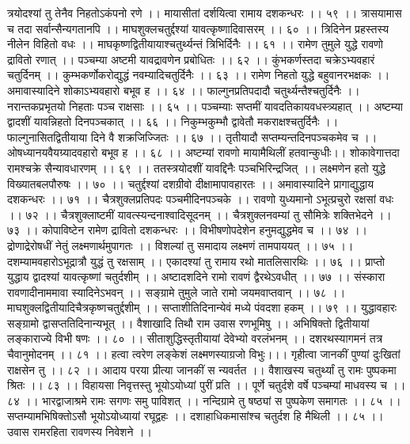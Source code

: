 त्रयोदश्यां तु तेनैव निहतोऽकंपनो रणे ।।
मायासीतां दर्शयित्वा रामाय दशकन्धरः ।। ५९ ।।
त्रासयामास च तदा सर्वान्सैन्यगतानपि ।।
माघशुक्लचतुर्द्दश्यां यावत्कृष्णादिवासरम् ।। ६० ।।
त्रिदिनेन प्रहस्तस्य नीलेन विहितो वधः ।।
माघकृष्णद्वितीयायाश्चतुर्थ्यन्तं त्रिभिर्दिनैः ।। ६१ ।।
रामेण तुमुले युद्धे रावणो द्रावितो रणात् ।।
पञ्चम्या अष्टमी यावद्रावणेन प्रबोधितः ।। ६२ ।।
कुंभकर्णस्तदा चक्रेऽभ्यवहारं चतुर्दिनम् ।।
कुम्भकर्णोकरोद्युद्धं नवम्यादिचतुर्दिनैः ।। ६३ ।।
रामेण निहतो युद्धे बहुवानरभक्षकः ।।
अमावास्यादिने शोकाऽभ्यवहारो बभूव ह ।। ६४ ।।
फाल्गुनप्रतिपदादौ चतुर्थ्यन्तैश्चतुर्दिनैः ।।
नरान्तकप्रभृतयो निहताः पञ्च राक्षसाः ।। ६५ ।।
पञ्चम्याः सप्तमीं यावदतिकायवधस्त्र्यहात् ।।
अष्टम्या द्वादशीं यावन्निहतो दिनपञ्चकात् ।। ६६ ।।
निकुम्भकुम्भौ द्वावेतौ मकराक्षश्चतुर्दिनैः ।।
फाल्गुनासितद्वितीयाया दिने वै शक्रजिज्जितः ।। ६७ ।।
तृतीयादौ सप्तम्यन्तदिनपञ्चकमेव च ।।
ओषध्यानयवैयग्र्यादवहारो बभूव ह ।। ६८ ।।
अष्टम्यां रावणो मायामैथिलीं हतवान्कुधीः।।
शोकावेगात्तदा रामश्चक्रे सैन्यावधारणम् ।। ६९ ।।
ततस्त्रयोदशीं यावद्दिनैः पञ्चभिरिन्द्रजित् ।।
लक्ष्मणेन हतो युद्धे विख्यातबलपौरुषः ।। ७० ।।
चतुर्द्दश्यां दशग्रीवो दीक्षामापावहारतः ।।
अमावास्यादिने प्रागाद्युद्धाय दशकन्धरः ।। ७१ ।।
चैत्रशुक्लप्रतिपदः पञ्चमीदिनपञ्चके ।।
रावणो युध्यमानो ऽभूत्प्रचुरो रक्षसां वधः ।। ७२ ।।
चैत्रशुक्लाष्टमीं यावत्स्यन्दनाश्वादिसूदनम् ।।
चैत्रशुक्लनवम्यां तु सौमित्रेः शक्तिभेदने ।। ७३ ।।
कोपाविष्टेन रामेण द्रावितो दशकन्धरः ।।
विभीषणोपदेशेन हनुमद्युद्धमेव च ।। ७४ ।।
द्रोणाद्रेरोषधीं नेतुं लक्ष्मणार्थमुपागतः ।।
विशल्यां तु समादाय लक्ष्मणं तामपाययत् ।। ७५ ।।
दशम्यामवहारोऽभूद्रात्रौ युद्धं तु रक्षसाम् ।।
एकादश्यां तु रामाय रथो मातलिसारथिः ।। ७६ ।।
प्राप्तो युद्धाय द्वादश्यां यावत्कृष्णां चतुर्दशीम् ।।
अष्टादशदिने रामो रावणं द्वैरथेऽवधीत् ।। ७७ ।।
संस्कारा रावणादीनाममावा स्यादिनेऽभवन् ।।
सङ्ग्रामे तुमुले जाते रामो जयमवाप्तवान् ।। ७८ ।।
माघशुक्लद्वितीयादिचैत्रकृष्णचतुर्द्दशीम् ।।
सप्ताशीतिदिनान्येवं मध्ये पंवदशा हकम् ।। ७९ ।।
युद्धावहारः सङ्ग्रामो द्वासप्ततिदिनान्यभूत् ।।
वैशाखादि तिथौ राम उवास रणभूमिषु ।।
अभिषिक्तो द्वितीयायां लङ्काराज्ये विभी षणः ।। ८० ।।
सीताशुद्धिस्तृतीयायां देवेभ्यो वरलंभनम् ।।
दशरथस्यागमनं तत्र चैवानुमोदनम् ।। ८१ ।।
हत्वा त्वरेण लङ्केशं लक्ष्मणस्याग्रजो विभुः।।।
गृहीत्वा जानकीं पुण्यां दुःखितां राक्षसेन तु ।। ८२ ।।
आदाय परया प्रीत्या जानकीं स न्यवर्तत ।।
वैशाखस्य चतुर्थ्यां तु रामः पुष्पकमा श्रितः ।। ८३ ।।
विहायसा निवृत्तस्तु भूयोऽयोध्यां पुरीं प्रति ।।
पूर्णे चतुर्दशे वर्षे पञ्चम्यां माधवस्य च ।। ८४ ।।
भारद्वाजाश्रमे रामः सगणः समु पाविशत् ।।
नन्दिग्रामे तु षष्ठ्यां स पुष्पकेण समागतः ।। ८५ ।।
सप्तम्यामभिषिक्तोऽसौ भूयोऽयोध्यायां रघूद्वहः ।।
दशाहाधिकमासांश्च चतुर्दश हि मैथिली ।। ८५ ।।
उवास रामरहिता रावणस्य निवेशने ।।
